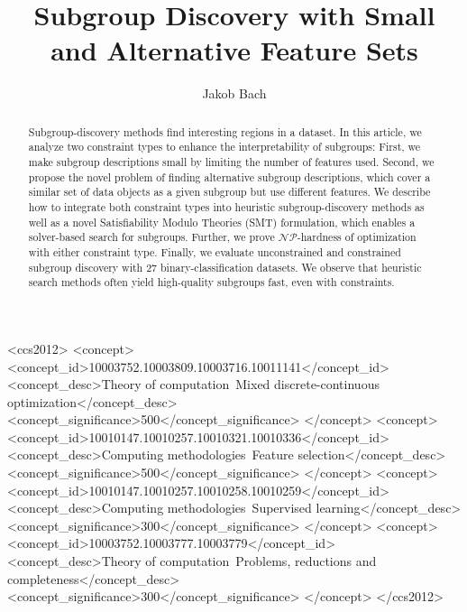\documentclass[acmsmall]{acmart} %
\theoremstyle{acmplain}
\theoremstyle{acmdefinition}
\begin{document}
\title{Subgroup Discovery with Small and Alternative Feature Sets}

\author{Jakob Bach}


\begin{abstract}
Subgroup-discovery methods find interesting regions in a dataset.
In this article, we analyze two constraint types to enhance the interpretability of subgroups:
First, we make subgroup descriptions small by limiting the number of features used.
Second, we propose the novel problem of finding alternative subgroup descriptions, which cover a similar set of data objects as a given subgroup but use different features.
We describe how to integrate both constraint types into heuristic subgroup-discovery methods as well as a novel Satisfiability Modulo Theories (SMT) formulation, which enables a solver-based search for subgroups.
Further, we prove $\mathcal{NP}$-hardness of optimization with either constraint type.
Finally, we evaluate unconstrained and constrained subgroup discovery with 27 binary-classification datasets.
We observe that heuristic search methods often yield high-quality subgroups fast, even with constraints.
\end{abstract}

\begin{CCSXML}
	<ccs2012>
	<concept>
	<concept_id>10003752.10003809.10003716.10011141</concept_id>
	<concept_desc>Theory of computation~Mixed discrete-continuous optimization</concept_desc>
	<concept_significance>500</concept_significance>
	</concept>
	<concept>
	<concept_id>10010147.10010257.10010321.10010336</concept_id>
	<concept_desc>Computing methodologies~Feature selection</concept_desc>
	<concept_significance>500</concept_significance>
	</concept>
	<concept>
	<concept_id>10010147.10010257.10010258.10010259</concept_id>
	<concept_desc>Computing methodologies~Supervised learning</concept_desc>
	<concept_significance>300</concept_significance>
	</concept>
	<concept>
	<concept_id>10003752.10003777.10003779</concept_id>
	<concept_desc>Theory of computation~Problems, reductions and completeness</concept_desc>
	<concept_significance>300</concept_significance>
	</concept>
	</ccs2012>
\end{CCSXML}
\end{document}
